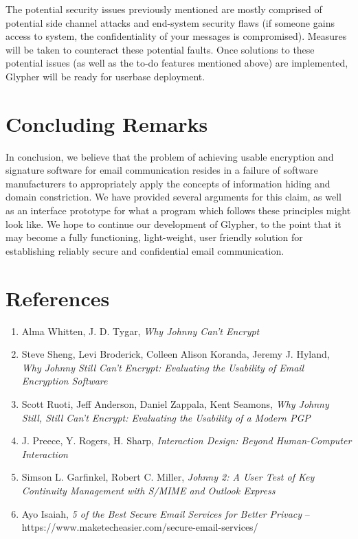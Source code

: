 \documentclass[journal]{IEEEtran}
\begin{document}
The potential security issues previously mentioned are mostly comprised of potential side channel attacks and end-system security flaws (if someone gains access to system, the confidentiality of your messages is compromised). Measures will be taken to counteract these potential faults. Once solutions to these potential issues (as well as the to-do features mentioned above) are implemented, Glypher will be ready for userbase deployment.\\

\section{Concluding Remarks}

In conclusion, we believe that the problem of achieving usable encryption and signature software for email communication resides in a failure of software manufacturers to appropriately apply the concepts of information hiding and domain constriction. We have provided several arguments for this claim, as well as an interface prototype for what a program which follows these principles might look like. We hope to continue our development of Glypher, to the point that it may become a fully functioning, light-weight, user friendly solution for establishing reliably secure and confidential email communication.

\section*{References}

\begin{enumerate}
\item Alma Whitten, J. D. Tygar, \textit{Why Johnny Can't Encrypt}
\item Steve Sheng, Levi Broderick, Colleen Alison Koranda, Jeremy J. Hyland, \textit{Why Johnny Still Can't Encrypt: Evaluating the Usability of Email Encryption Software}
\item Scott Ruoti, Jeff Anderson, Daniel Zappala, Kent Seamons, \textit{Why Johnny Still, Still Can't Encrypt: Evaluating the Usability of a Modern PGP}
\item J. Preece, Y. Rogers, H. Sharp, \textit{Interaction Design: Beyond Human-Computer Interaction}
\item Simson L. Garfinkel, Robert C. Miller, \textit{Johnny 2: A User Test of Key Continuity Management with S/MIME and Outlook Express}
\item Ayo Isaiah, \textit{5 of the Best Secure Email Services for Better Privacy} -- https://www.maketecheasier.com/secure-email-services/
\end{enumerate}
\end{document}
